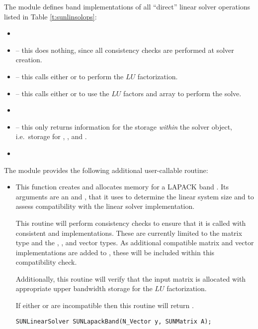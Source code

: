 \noindent The {\sunlinsollapband} module defines band implementations of all
``direct'' linear solver operations listed in
Table \ref{t:sunlinsolops}:
\begin{itemize}
\item {}
\item {} -- this does nothing, since all
  consistency checks are performed at solver creation.
\item {} -- this calls either
   or  to perform the $LU$ factorization.
\item {} -- this calls either
   or  to use the $LU$ factors and 
  array to perform the solve.
\item {}
\item {} -- this only returns information for
  the storage \emph{within} the solver object, i.e.~storage
  for , , and .
\item {}
\end{itemize}
The module {\sunlinsollapband} provides the following additional
user-callable routine: 
\begin{itemize}


\item {}

  This function creates and allocates memory for a LAPACK band
  .  Its arguments are an {\nvector} and
  {\sunmatrix}, that it uses to determine the linear system size and
  to assess compatibility with the linear solver implementation.

  This routine will perform consistency checks to ensure that it is
  called with consistent {\nvector} and {\sunmatrix} implementations.
  These are currently limited to the {\sunmatband} matrix type and
  the {\nvecs}, {\nvecopenmp}, and {\nvecpthreads} vector types.  As
  additional compatible matrix and vector implementations are added to
  {\sundials}, these will be included within this compatibility check.

  Additionally, this routine will verify that the input matrix 
  is allocated with appropriate upper bandwidth storage for the $LU$
  factorization.

  If either  or  are incompatible then this routine will
  return .

  \verb|SUNLinearSolver SUNLapackBand(N_Vector y, SUNMatrix A);|

\end{itemize}
